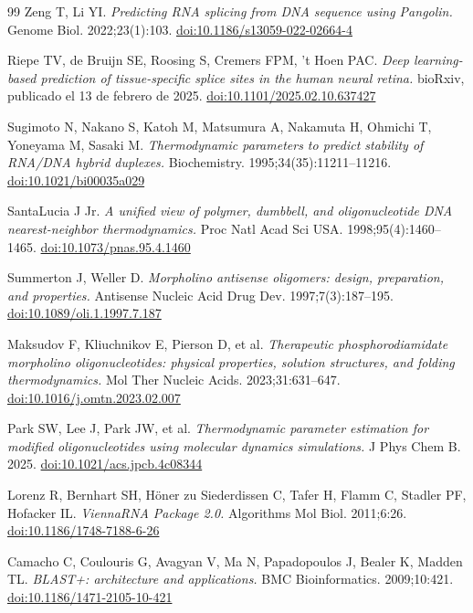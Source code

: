 \documentclass[11pt,a4paper]{article}
\begin{document}
\begin{thebibliography}{99}
Zeng T, Li YI. \emph{Predicting RNA splicing from DNA sequence using Pangolin.}
Genome Biol. 2022;23(1):103.
\href{https://doi.org/10.1186/s13059-022-02664-4}{doi:10.1186/s13059-022-02664-4}

Riepe TV, de Bruijn SE, Roosing S, Cremers FPM, 't Hoen PAC.
\emph{Deep learning-based prediction of tissue-specific splice sites in the human neural retina.}
bioRxiv, publicado el 13 de febrero de 2025.
\href{https://doi.org/10.1101/2025.02.10.637427}{doi:10.1101/2025.02.10.637427}

Sugimoto N, Nakano S, Katoh M, Matsumura A, Nakamuta H, Ohmichi T, Yoneyama M, Sasaki M.
\emph{Thermodynamic parameters to predict stability of RNA/DNA hybrid duplexes.}
Biochemistry. 1995;34(35):11211--11216.
\href{https://doi.org/10.1021/bi00035a029}{doi:10.1021/bi00035a029}

SantaLucia J Jr. \emph{A unified view of polymer, dumbbell, and oligonucleotide DNA
nearest-neighbor thermodynamics.} Proc Natl Acad Sci USA. 1998;95(4):1460--1465.
\href{https://doi.org/10.1073/pnas.95.4.1460}{doi:10.1073/pnas.95.4.1460}

Summerton J, Weller D. \emph{Morpholino antisense oligomers: design, preparation, and properties.}
Antisense Nucleic Acid Drug Dev. 1997;7(3):187--195.
\href{https://doi.org/10.1089/oli.1.1997.7.187}{doi:10.1089/oli.1.1997.7.187}

Maksudov F, Kliuchnikov E, Pierson D, et al.
\emph{Therapeutic phosphorodiamidate morpholino oligonucleotides: physical properties, solution
structures, and folding thermodynamics.} Mol Ther Nucleic Acids. 2023;31:631--647.
\href{https://doi.org/10.1016/j.omtn.2023.02.007}{doi:10.1016/j.omtn.2023.02.007}

Park SW, Lee J, Park JW, et al. \emph{Thermodynamic parameter estimation for modified
oligonucleotides using molecular dynamics simulations.} J Phys Chem B. 2025.
\href{https://doi.org/10.1021/acs.jpcb.4c08344}{doi:10.1021/acs.jpcb.4c08344}

Lorenz R, Bernhart SH, H\"oner zu Siederdissen C, Tafer H, Flamm C, Stadler PF, Hofacker IL.
\emph{ViennaRNA Package 2.0.} Algorithms Mol Biol. 2011;6:26.
\href{https://doi.org/10.1186/1748-7188-6-26}{doi:10.1186/1748-7188-6-26}

Camacho C, Coulouris G, Avagyan V, Ma N, Papadopoulos J, Bealer K, Madden TL.
\emph{BLAST+: architecture and applications.} BMC Bioinformatics. 2009;10:421.
\href{https://doi.org/10.1186/1471-2105-10-421}{doi:10.1186/1471-2105-10-421}


\end{thebibliography}
\end{document}
